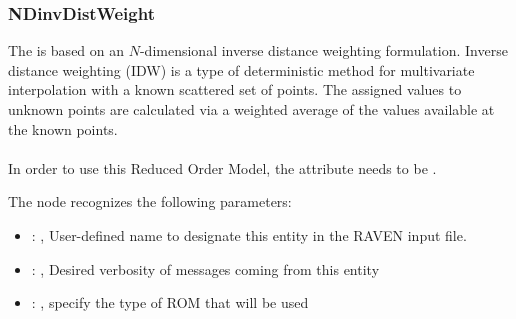 \subsubsection{NDinvDistWeight}
  The  is based on an                             $N$-dimensional inverse
  distance weighting formulation.                             Inverse distance weighting (IDW) is a
  type of deterministic method for                             multivariate interpolation with a
  known scattered set of points.                             The assigned values to unknown points
  are calculated via a weighted average of                             the values available at the
  known points.                             \\
                               \\
  In order to use this Reduced Order Model, the  attribute
   needs to be .

  The  node recognizes the following parameters:
    \begin{itemize}
      \item {}: ,
        User-defined name to designate this entity in the RAVEN input file.
      \item {}: ,
        Desired verbosity of messages coming from this entity
      \item {}: ,
        specify the type of ROM that will be used
  \end{itemize}

